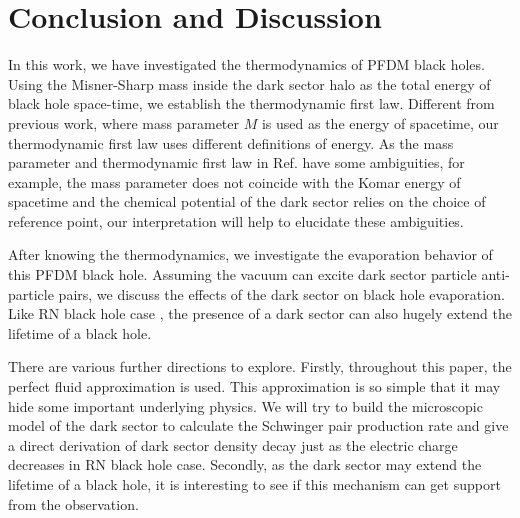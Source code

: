 \documentclass[a4paper,11pt]{article}
\begin{document}

\section{Conclusion and Discussion}
In this work, we have investigated the thermodynamics of PFDM black holes. Using the Misner-Sharp mass inside the dark sector halo as the total energy of black hole space-time, we establish the thermodynamic first law. Different from previous work, where mass parameter $M$ is used as the energy of spacetime, our thermodynamic first law uses different definitions of energy. As the mass parameter and thermodynamic first law in Ref.\cite{Cao:2021dcq, Xu:2016ylr} have some ambiguities, for example, the mass parameter does not coincide with the Komar energy of spacetime and the chemical potential of the dark sector relies on the choice of reference point,
our interpretation will help to elucidate these ambiguities. 

After knowing the thermodynamics, we investigate the evaporation behavior of this PFDM black hole. Assuming the vacuum can excite dark sector particle anti-particle pairs, we discuss the effects of the dark sector on black hole evaporation. Like RN black hole case \cite{Hiscock:1990ex,Xu:2019wak}, the presence of a dark sector can also hugely extend the lifetime of a black hole. 

There are various further directions to explore.  Firstly, throughout this paper, the perfect fluid approximation is used. This approximation is so simple that it may hide some important underlying physics. We will try to build the microscopic model of the dark sector to calculate the Schwinger pair production rate and give a direct derivation of dark sector density decay just as the electric charge decreases in RN black hole case.  Secondly, as the dark sector may extend the lifetime of a black hole, it is interesting to see if this mechanism can get support from the observation. 
\end{document}
